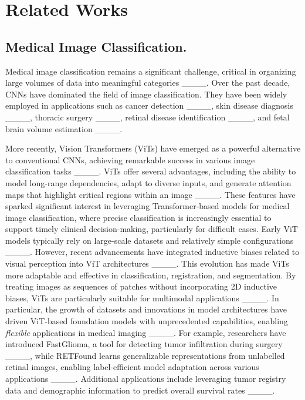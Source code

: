 \section{Related Works}
\label{sec:2}

\subsection{Medical Image Classification.}
Medical image classification remains a significant challenge, critical in organizing large volumes of data into meaningful categories ____. Over the past decade, CNNs have dominated the field of image classification. They have been widely employed in applications such as cancer detection ____, skin disease diagnosis ____, thoracic surgery ____, retinal disease identification ____, and fetal brain volume estimation ____.

More recently, Vision Transformers (ViTs) have emerged as a powerful alternative to conventional CNNs, achieving remarkable success in various image classification tasks ____. ViTs offer several advantages, including the ability to model long-range dependencies, adapt to diverse inputs, and generate attention maps that highlight critical regions within an image ____. These features have sparked significant interest in leveraging Transformer-based models for medical image classification, where precise classification is increasingly essential to support timely clinical decision-making, particularly for difficult cases.
Early ViT models typically rely on large-scale datasets and relatively simple configurations ____. However, recent advancements have integrated inductive biases related to visual perception into ViT architectures ____. This evolution has made ViTs more adaptable and effective in classification, registration, and segmentation. By treating images as sequences of patches without incorporating 2D inductive biases, ViTs are particularly suitable for multimodal applications ____.
In particular, the growth of datasets and innovations in model architectures have driven ViT-based foundation models with unprecedented capabilities, enabling \textit{flexible} applications in medical imaging ____. For example, researchers have introduced FastGlioma, a tool for detecting tumor infiltration during surgery ____, while RETFound learns generalizable representations from unlabelled retinal images, enabling label-efficient model adaptation across various applications ____. Additional applications include leveraging tumor registry data and demographic information to predict overall survival rates ____. %


